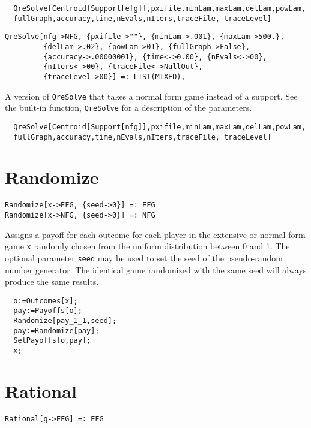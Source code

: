 \udfbody
\begin{verbatim}
  QreSolve[Centroid[Support[efg]],pxifile,minLam,maxLam,delLam,powLam, 
  fullGraph,accuracy,time,nEvals,nIters,traceFile, traceLevel]
\end{verbatim} 

\newsignature

\begin{verbatim}
QreSolve[nfg->NFG, {pxifile->""}, {minLam->.001}, {maxLam->500.}, 
         {delLam->.02}, {powLam->01}, {fullGraph->False}, 
         {accuracy->.00000001}, {time<->0.00}, {nEvals<->00}, 
         {nIters<->00}, {traceFile<->NullOut}, 
         {traceLevel->00}] =: LIST(MIXED),
\end{verbatim}

\noindent
A version of \verb+QreSolve+ that takes a normal form
game instead of a support.  See the built-in function,
\verb+QreSolve+ for a description of the parameters.

\udfbody
\begin{verbatim}
  QreSolve[Centroid[Support[nfg]],pxifile,minLam,maxLam,delLam,powLam,
  fullGraph,accuracy,time,nEvals,nIters,traceFile, traceLevel]
\end{verbatim} 


\section*{Randomize}\label{ExtRandomize}
\begin{verbatim}
Randomize[x->EFG, {seed->0}] =: EFG 
Randomize[x->NFG, {seed->0}] =: NFG 
\end{verbatim}

\noindent
Assigns a payoff for each outcome for each player in the extensive
or normal form game \verb+x+ randomly chosen from the uniform
distribution between 0 and 1.  The optional parameter \verb+seed+ may
be used to set the seed of the pseudo-random number generator.  The
identical game randomized with the same seed will always produce the
same results.

\udfbody
\begin{verbatim}
  o:=Outcomes[x];
  pay:=Payoffs[o];
  Randomize[pay_1_1,seed];
  pay:=Randomize[pay];
  SetPayoffs[o,pay];
  x;
\end{verbatim} 


\section*{Rational}\label{ExtRational}
\begin{verbatim}
Rational[g->EFG] =: EFG 
\end{verbatim}

